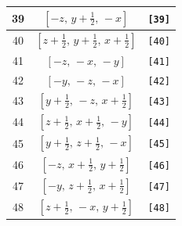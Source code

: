 \documentclass[fleqn,8pt]{jsarticle}
\begin{document}
\begin{longtable}{ccc}
39 & $\left[ - z,\, y + \frac{1}{2},\, - x \right]$ & {\tt [39]} \\ \hline
40 & $\left[ z + \frac{1}{2},\, y + \frac{1}{2},\, x + \frac{1}{2} \right]$ & {\tt [40]} \\ \hline
41 & $\left[ - z,\, - x,\, - y \right]$ & {\tt [41]} \\ \hline
42 & $\left[ - y,\, - z,\, - x \right]$ & {\tt [42]} \\ \hline
43 & $\left[ y + \frac{1}{2},\, - z,\, x + \frac{1}{2} \right]$ & {\tt [43]} \\ \hline
44 & $\left[ z + \frac{1}{2},\, x + \frac{1}{2},\, - y \right]$ & {\tt [44]} \\ \hline
45 & $\left[ y + \frac{1}{2},\, z + \frac{1}{2},\, - x \right]$ & {\tt [45]} \\ \hline
46 & $\left[ - z,\, x + \frac{1}{2},\, y + \frac{1}{2} \right]$ & {\tt [46]} \\ \hline
47 & $\left[ - y,\, z + \frac{1}{2},\, x + \frac{1}{2} \right]$ & {\tt [47]} \\ \hline
48 & $\left[ z + \frac{1}{2},\, - x,\, y + \frac{1}{2} \right]$ & {\tt [48]} \\
\end{longtable}
\end{document}
